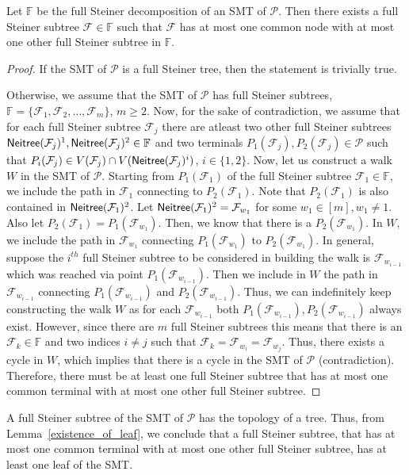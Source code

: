 \begin{lemma}
\label{existence_of_leaf}
Let $\mathbb{F}$ be the full Steiner decomposition of an SMT of $\mathcal{P}$.  Then there exists a full Steiner subtree $\mathcal F \in \mathbb{F}$ such that $\mathcal F$ has at most one common node with at most one other full Steiner subtree in $\mathbb{F}$.
\end{lemma}
\begin{proof}
If the SMT of $\mathcal P$ is a full Steiner tree, then the statement is trivially true.

Otherwise, we assume that the SMT of $\mathcal P$ has full Steiner subtrees, $\mathbb{F} = \{\mathcal F_1, \mathcal F_2, \ldots, \mathcal F_m\}$, $m \ge 2$. Now, for the sake of contradiction, we assume that for each full Steiner subtree $\mathcal F_j$ there are atleast two other full Steiner subtrees ${\sf Neitree}(\mathcal F_j)^1,{\sf Neitree}(\mathcal F_j)^2 \in \mathbb{F}$ and two terminals $P_1(\mathcal F_j),P_2(\mathcal F_j) \in \mathcal{P}$ such that $P_i(\mathcal F_j) \in V(\mathcal F_j) \cap V({\sf Neitree}(\mathcal F_j)^i)$, $i \in \{1,2\}$. Now, let us construct a walk $W$ in the SMT of $\mathcal{P}$. Starting from $P_1(\mathcal F_1)$ of the full Steiner subtree $\mathcal F_1 \in \mathbb{F}$, we include the path in $\mathcal F_1$ connecting to $P_2(\mathcal F_1)$. Note that $P_2(\mathcal F_1)$ is also contained in ${\sf Neitree}(\mathcal F_1)^2$. Let ${\sf Neitree}(\mathcal F_1)^2 = \mathcal F_{w_1}$ for some $w_1\in [m], w_1\neq 1$. Also let $P_2(\mathcal F_1) = P_1(\mathcal F_{w_1})$.
Then, we know that there is a $P_2(\mathcal F_{w_1})$. In $W$, we include the path in $\mathcal F_{w_1}$ connecting $P_1(\mathcal F_{w_1})$ to $P_2(\mathcal F_{w_1})$. In general, suppose the $i^{th}$ full Steiner subtree to be considered in building the walk is $\mathcal F_{w_{i-1}}$ which was reached via point $P_1(\mathcal F_{w_{i-1}})$. Then we include in $W$ the path in $\mathcal F_{w_{i-1}}$ connecting $P_1(\mathcal F_{w_{i-1}})$ and $P_2(\mathcal F_{w_{i-1}})$. Thus, we can indefinitely keep constructing the walk $W$ as for each $\mathcal F_{w_{i-1}}$ both $P_1(\mathcal F_{w_{i-1}}), P_2(\mathcal F_{w_{i-1}})$ always exist. However, since there are $m$ full Steiner subtrees this means that there is an $\mathcal F_k \in \mathbb{F}$ and two indices $i\neq j$ such that $\mathcal F_k = \mathcal F_{w_i} = \mathcal F_{w_j}$. Thus, there exists a cycle in $W$, which implies that there is a cycle in the SMT of $\mathcal{P}$ (contradiction). Therefore, there must be at least one full Steiner subtree that has at most one common terminal with at most one other full Steiner subtree.
\end{proof}
\begin{remark}
A full Steiner subtree of the SMT of $\mathcal P$ has the topology of a tree. Thus, from Lemma~\ref{existence_of_leaf}, we conclude that a full Steiner subtree, that has at most one common terminal with at most one other full Steiner subtree, has at least one leaf of the SMT.
\end{remark}


